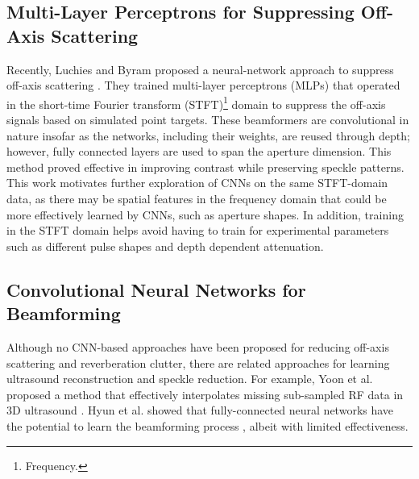     \subsection{Multi-Layer Perceptrons for Suppressing Off-Axis Scattering}
      Recently, Luchies and Byram proposed a neural-network approach to suppress off-axis scattering \cite{luchies_tmi_2018, training_improvements}. They trained multi-layer perceptrons (MLPs) that operated in the short-time Fourier transform (STFT)\footnote{Frequency.} domain to suppress the off-axis signals based on simulated point targets. These beamformers are convolutional in nature insofar as the networks, including their weights, are reused through depth; however, fully connected layers are used to span the aperture dimension. This method proved effective in improving contrast while preserving speckle patterns. This work motivates further exploration of CNNs on the same STFT-domain data, as there may be spatial features in the frequency domain that could be more effectively learned by CNNs, such as aperture shapes. In addition, training in the STFT domain helps avoid having to train for experimental parameters such as different pulse shapes and depth dependent attenuation. %

    \subsection{Convolutional Neural Networks for Beamforming}
      Although no CNN-based approaches have been proposed for reducing off-axis scattering and reverberation clutter, there are related approaches for learning ultrasound reconstruction and speckle reduction. For example, Yoon et al. proposed a method that effectively interpolates missing sub-sampled RF data in 3D ultrasound \cite{yoon2018efficient}. Hyun et al. showed that fully-connected neural networks have the potential to learn the beamforming process \cite{hyun2019beamforming}, albeit with limited effectiveness.

